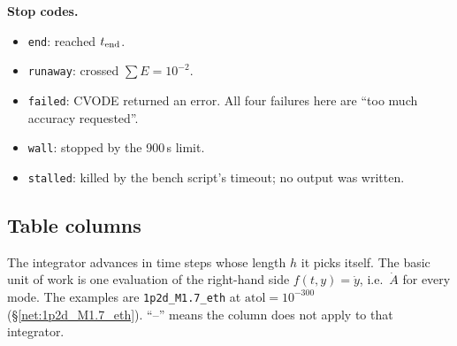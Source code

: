 \documentclass[10pt,a4paper]{article}
\newcommand{\atol}{\mathrm{atol}}
\begin{document}
\textbf{Stop codes.}
\begin{itemize}
    \item \texttt{end}: reached $t_{\rm end}$.
    \item \texttt{runaway}: crossed $\sum E=10^{-2}$.
    \item \texttt{failed}: CVODE returned an error. All four failures here are ``too much accuracy requested''.
    \item \texttt{wall}: stopped by the 900\,s limit.
    \item \texttt{stalled}: killed by the bench script's timeout; no output was written.
\end{itemize}

\subsection{Table columns}\label{sec:columns}
The integrator advances in time steps whose length $h$ it picks itself. The basic unit of work is one evaluation of the right-hand side $f(t,y)=\dot y$, i.e.\ $\dot A$ for every mode. The examples are \texttt{1p2d\_M1.7\_eth} at $\atol=10^{-300}$ (\S\ref{net:1p2d_M1.7_eth}). ``--'' means the column does not apply to that integrator.
\end{document}
